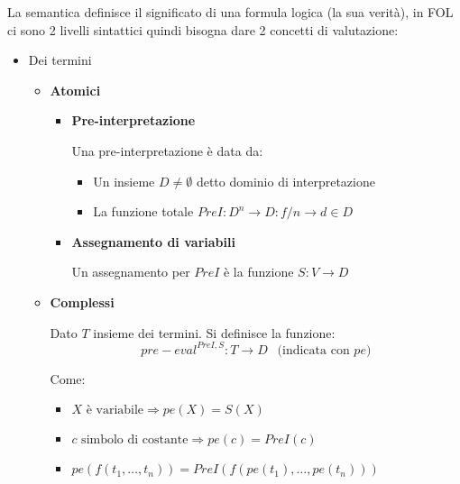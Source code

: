 \documentclass{article}
\begin{document}
La semantica definisce il significato di una formula logica (la sua verità), in FOL ci sono 2 livelli sintattici quindi bisogna dare 2 concetti di valutazione:
\begin{itemize}
    \item Dei termini
            \begin{itemize}
                \item \textbf{Atomici}
                        \begin{itemize}
                \item \textbf{Pre-interpretazione}

                    \vspace{5pt}

                    Una pre-interpretazione è data da:
                        \begin{itemize}
                            \item Un insieme $D\neq\emptyset$ detto dominio di interpretazione
                            \item La funzione totale $PreI:D^n\rightarrow D:f/n\rightarrow d\in D$
                        \end{itemize}
                
                \item \textbf{Assegnamento di variabili}

                    \vspace{5pt}

                    Un assegnamento per $PreI$ è la funzione $S:V\rightarrow D$

            \end{itemize}
            \item \textbf{Complessi}

            \vspace{5pt}

            Dato $T$ insieme dei termini. Si definisce la funzione: 
            $$pre-eval^{PreI,S}:T\rightarrow D\ \ \text{ (indicata con }pe)$$ 
            
            Come:
                \begin{itemize}
                    \item $X\text{ è variabile}\Rightarrow pe(X)=S(X)$
                    \item $c\text{ simbolo di costante}\Rightarrow pe(c)=PreI(c)$
                    \item $pe(f(t_1,\ldots,t_n))=PreI(f(pe(t_1),\ldots,pe(t_n)))$
                \end{itemize}
            

\end{itemize}
\end{itemize}
\end{document}
